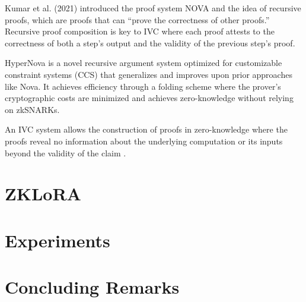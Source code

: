 \documentclass{article}
\begin{document}
Kumar et al. (2021) \cite{kothapalli2022nova} introduced the proof system NOVA and the idea of recursive proofs, which are proofs that can ``prove the correctness of other proofs.'' Recursive proof composition is key to IVC where each proof attests to the correctness of both a step’s output and the validity of the previous step’s proof.

HyperNova \cite{kothapalli2024hypernova} is a novel recursive argument system optimized for customizable constraint systems (CCS) that generalizes and improves upon prior approaches like Nova. It achieves efficiency through a folding scheme where the prover’s cryptographic costs are minimized and achieves zero-knowledge without relying on zkSNARKs.

An IVC system allows the construction of proofs in zero-knowledge where the   proofs reveal no information about the underlying computation or its inputs beyond the validity of the claim \cite{valiant2008incrementally}.


\section{ZKLoRA}





\section{Experiments}



\section{Concluding Remarks}




\end{document}
